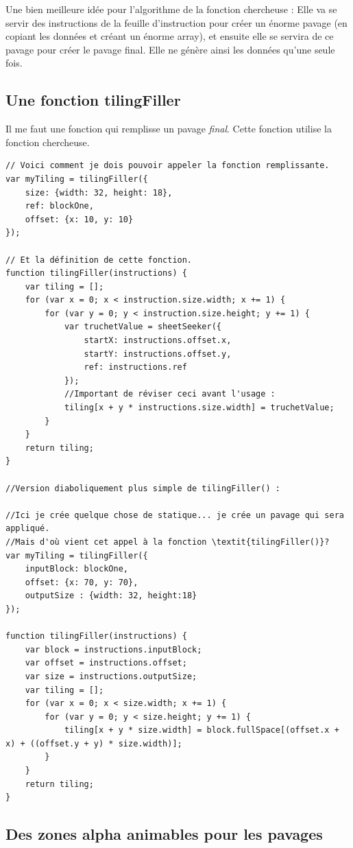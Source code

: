 Une bien meilleure idée pour l'algorithme de la fonction chercheuse : Elle va se servir des instructions de la feuille d'instruction pour créer un énorme pavage (en copiant les données et créant un énorme array), et ensuite elle se servira de ce pavage pour créer le pavage final. Elle ne génère ainsi les données qu'une seule fois.

\subsection{Une fonction tilingFiller}
Il me faut une fonction qui remplisse un pavage \textit{final}. Cette fonction utilise la fonction chercheuse.
\begin{lstlisting}
// Voici comment je dois pouvoir appeler la fonction remplissante.
var myTiling = tilingFiller({
    size: {width: 32, height: 18},
    ref: blockOne,
    offset: {x: 10, y: 10}
});

// Et la définition de cette fonction.
function tilingFiller(instructions) {
    var tiling = [];
    for (var x = 0; x < instruction.size.width; x += 1) {
        for (var y = 0; y < instruction.size.height; y += 1) {
            var truchetValue = sheetSeeker({
                startX: instructions.offset.x,
                startY: instructions.offset.y,
                ref: instructions.ref
            });
            //Important de réviser ceci avant l'usage :
            tiling[x + y * instructions.size.width] = truchetValue;
        }
    }
    return tiling;
}

//Version diaboliquement plus simple de tilingFiller() :

//Ici je crée quelque chose de statique... je crée un pavage qui sera appliqué. 
//Mais d'où vient cet appel à la fonction \textit{tilingFiller()}?
var myTiling = tilingFiller({
    inputBlock: blockOne,
    offset: {x: 70, y: 70},
    outputSize : {width: 32, height:18}
});

function tilingFiller(instructions) {
    var block = instructions.inputBlock;
    var offset = instructions.offset;
    var size = instructions.outputSize;
    var tiling = [];
    for (var x = 0; x < size.width; x += 1) {
        for (var y = 0; y < size.height; y += 1) {
            tiling[x + y * size.width] = block.fullSpace[(offset.x + x) + ((offset.y + y) * size.width)];
        }
    }
    return tiling;
}
\end{lstlisting}
\subsection{Des zones alpha animables pour les pavages}

